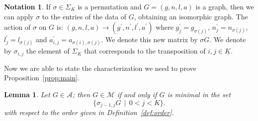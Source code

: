 \documentclass{amsart}
\theoremstyle{plain}
\newtheorem{lemma}[theorem]{Lemma}
\theoremstyle{definition}
\newtheorem{notation}[theorem]{Notation}
\newcommand{\ubar}[1]{\underline{#1}}
\begin{document}
\begin{notation}
  If $\sigma \in \Sigma_K$ is a permutation and $G = (g, n, l, a)$ is
  a graph, then we can apply $\sigma$ to the entries of the data of
  $G$, obtaining an isomorphic graph. The action of $\sigma$ on $G$
  is: $(g,n,l,a)\to (g^\prime,n^\prime,l^\prime,a^\prime)$ where
  $g^\prime_j=g_{\sigma(j)}$, $n^\prime_j=n_{\sigma(j)}$,
  $l^\prime_j=l_{\sigma(j)}$ and $a^\prime_{i,j} =
  a_{\sigma(i),\sigma(j)}$. We denote this new matrix by $\sigma
  G$. We denote by $\sigma_{i,j}$ the element of $\Sigma_K$ that
  corresponds to the transposition of $i, j \in \ubar{K}$.
\end{notation}

Now we are able to state the characterization we need to prove
Proposition~\ref{prop:main}.

\begin{lemma}\label{lemma:char}
  Let $G \in \mathcal{A}$; then $G \in \mathcal{M}$ if and only if $G$
  is minimal in the set
  \[
  \bigl\{ \sigma_{j-1,j} G \,\mid\, 0<j<K \bigr\}\text{.}
  \]
  with respect to the order given in Definition~\ref{def:order}.
\end{lemma}
\end{document}
